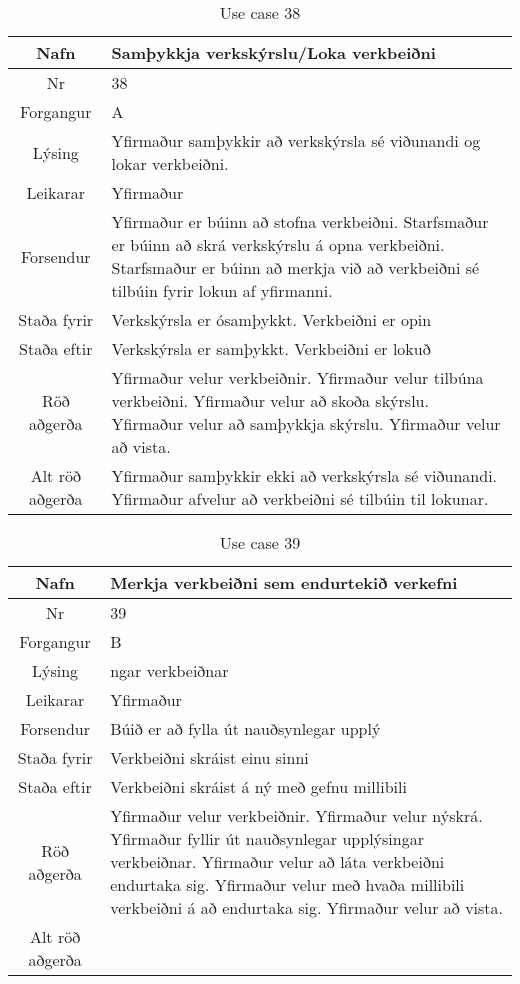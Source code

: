 \begin{table}[h!]\centering
\begin{tabular}{|c|p{10cm}|}
\hline
Nafn&Samþykkja verkskýrslu/Loka verkbeiðni\\
\hline
Nr&38\\
\hline
Forgangur&A\\
\hline
Lýsing&Yfirmaður samþykkir að verkskýrsla sé viðunandi og lokar verkbeiðni.\\
\hline
Leikarar&Yfirmaður\\
\hline
Forsendur&Yfirmaður er búinn að stofna verkbeiðni. Starfsmaður er búinn að skrá verkskýrslu á opna verkbeiðni. Starfsmaður er búinn að merkja við að verkbeiðni sé tilbúin fyrir lokun af yfirmanni.\\
\hline
Staða fyrir&Verkskýrsla er ósamþykkt. Verkbeiðni er opin\\
\hline
Staða eftir&Verkskýrsla er samþykkt. Verkbeiðni er lokuð\\
\hline
Röð aðgerða&Yfirmaður velur verkbeiðnir. Yfirmaður velur tilbúna verkbeiðni. Yfirmaður velur að skoða skýrslu. Yfirmaður velur að samþykkja skýrslu. Yfirmaður velur að vista.\\
\hline
Alt röð aðgerða&Yfirmaður samþykkir ekki að verkskýrsla sé viðunandi. Yfirmaður afvelur að verkbeiðni sé tilbúin til lokunar.\\
\hline
\end{tabular}
\caption{Use case 38}\label{tab:use_case_38}
\end{table}
\begin{table}[h!]\centering
\begin{tabular}{|c|p{10cm}|}
\hline
Nafn&Merkja verkbeiðni sem endurtekið verkefni\\
\hline
Nr&39\\
\hline
Forgangur&B\\
\hline
Lýsing&ngar verkbeiðnar\\
\hline
Leikarar&Yfirmaður\\
\hline
Forsendur&Búið er að fylla út nauðsynlegar upplý\\
\hline
Staða fyrir&Verkbeiðni skráist einu sinni\\
\hline
Staða eftir&Verkbeiðni skráist á ný með gefnu millibili\\
\hline
Röð aðgerða&Yfirmaður velur verkbeiðnir. Yfirmaður velur nýskrá. Yfirmaður fyllir út nauðsynlegar upplýsingar verkbeiðnar. Yfirmaður velur að láta verkbeiðni endurtaka sig. Yfirmaður velur með hvaða millibili verkbeiðni á að endurtaka sig. Yfirmaður velur að vista.\\
\hline
Alt röð aðgerða&\\
\hline
\end{tabular}
\caption{Use case 39}\label{tab:use_case_39}
\end{table}
